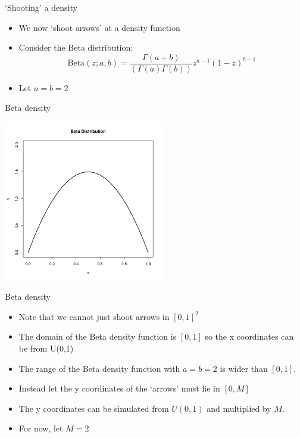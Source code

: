 \documentclass
[handout]
{beamer}
\begin{document}
\begin{frame}{`Shooting' a density}
\begin{itemize}
\item We now `shoot arrows' at a density function 
\pause
\item Consider the Beta distribution: 
\begin{equation}
\mbox{Beta}(z;a,b)=\frac{\Gamma(a+b)}{(\Gamma(a)\Gamma(b))}z^{a-1}(1-z)^{b-1}
\end{equation}
\pause
\item Let $a=b=2$ 
\end{itemize}
\end{frame}
\begin{frame}{Beta density}
\begin{center}
\includegraphics[height=7cm]{./Pics/bet1.pdf}
\end{center}
\end{frame}
\begin{frame}{Beta density}
\begin{itemize}
\item Note that we cannot just shoot arrows in $[0,1]^2$
\pause
\item The domain of the Beta density function is $\left[0,1\right]$ so the x coordinates can be from U(0,1)
\pause
\item The range of the Beta density function with $a=b=2$ is wider than $\left[0,1\right]$.
\pause
\item Instead let the y coordinates of the `arrows' must lie in $\left[0,M\right]$
\pause
\item The y coordinates can be simulated from $U(0,1)$ and multiplied by $M$.
\pause
\item For now, let $M=2$
\end{itemize}
\end{frame}
\end{document}
